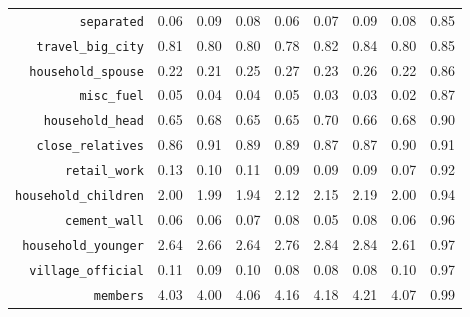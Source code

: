 \begin{longtable}{rrrrrrrrr}
  {\texttt{separated}} & 0.06 & 0.09 & 0.08 & 0.06 & 0.07 & 0.09 & 0.08 & 0.85 \\ 
  {\texttt{travel\_big\_city}} & 0.81 & 0.80 & 0.80 & 0.78 & 0.82 & 0.84 & 0.80 & 0.85 \\ 
  {\texttt{household\_spouse}} & 0.22 & 0.21 & 0.25 & 0.27 & 0.23 & 0.26 & 0.22 & 0.86 \\ 
  {\texttt{misc\_fuel}} & 0.05 & 0.04 & 0.04 & 0.05 & 0.03 & 0.03 & 0.02 & 0.87 \\ 
  {\texttt{household\_head}} & 0.65 & 0.68 & 0.65 & 0.65 & 0.70 & 0.66 & 0.68 & 0.90 \\ 
  {\texttt{close\_relatives}} & 0.86 & 0.91 & 0.89 & 0.89 & 0.87 & 0.87 & 0.90 & 0.91 \\ 
  {\texttt{retail\_work}} & 0.13 & 0.10 & 0.11 & 0.09 & 0.09 & 0.09 & 0.07 & 0.92 \\ 
  {\texttt{household\_children}} & 2.00 & 1.99 & 1.94 & 2.12 & 2.15 & 2.19 & 2.00 & 0.94 \\ 
  {\texttt{cement\_wall}} & 0.06 & 0.06 & 0.07 & 0.08 & 0.05 & 0.08 & 0.06 & 0.96 \\ 
  {\texttt{household\_younger}} & 2.64 & 2.66 & 2.64 & 2.76 & 2.84 & 2.84 & 2.61 & 0.97 \\ 
  {\texttt{village\_official}} & 0.11 & 0.09 & 0.10 & 0.08 & 0.08 & 0.08 & 0.10 & 0.97 \\ 
  {\texttt{members}} & 4.03 & 4.00 & 4.06 & 4.16 & 4.18 & 4.21 & 4.07 & 0.99 \\ 
   \hline
\hline
\end{longtable}
